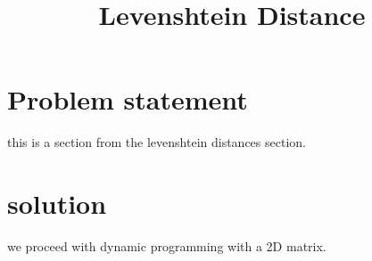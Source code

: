 \documentclass[12pt]{article}
\title{Levenshtein Distance}
\begin{document}
\maketitle
\section{Problem statement}
this is a section from the levenshtein distances section.
\section{solution}
we proceed with dynamic programming with a 2D matrix.
\end{document}
